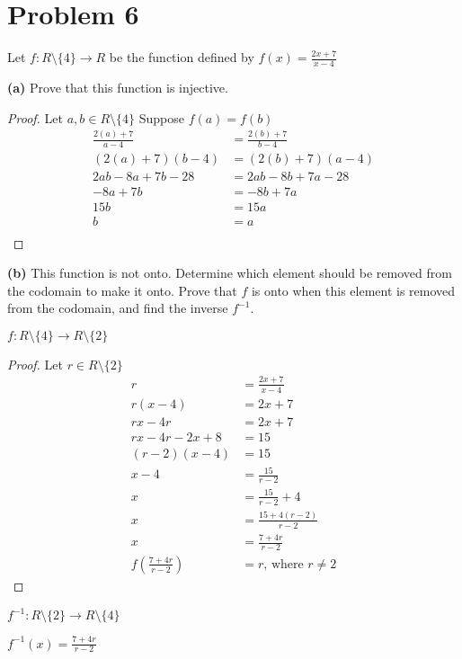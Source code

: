 \documentclass{article}
\newenvironment{problem}[1]{
  \nobreak\section*{Problem #1}
}{}
\begin{document}
  \begin{problem}{6}
    Let $f : R \setminus \{4\} \rightarrow R$ be the function defined by $f(x) = \frac{2x + 7}{x - 4}$
    \begin{flushleft}
      \textbf{(a)} Prove that this function is injective.
    \end{flushleft}
    \begin{proof}
      Let $a, b \in R \setminus \{4\}$ Suppose $f(a) = f(b)$
      \begin{equation*}
        \begin{split}
          \frac{2(a) + 7}{a - 4} & = \frac{2(b) + 7}{b - 4}\\
          (2(a) + 7)(b - 4) & = (2(b) + 7)(a - 4)\\
          2ab - 8a + 7b - 28 & = 2ab - 8b + 7a - 28\\
          -8a + 7b & = -8b + 7a\\
          15b & = 15a\\
          b & = a\\
        \end{split}
      \end{equation*}
    \end{proof}

    \begin{flushleft}
      \textbf{(b)} This function is not onto. Determine which element should be removed from the codomain to make it onto. Prove that $f$ is onto when this element is removed from the codomain, and find the inverse $f^{-1}$.
    \end{flushleft}

    \begin{center}
      $f : R \setminus \{4\} \rightarrow R \setminus \{2\}$
    \end{center}

    \begin{proof}
      Let $r \in R \setminus \{2\}$
      \begin{equation*}
        \begin{split}
          r & = \frac{2x + 7}{x - 4}\\
          r(x - 4) & = 2x + 7\\
          rx - 4r & = 2x + 7\\
          rx - 4r - 2x + 8 & = 15\\
          (r - 2)(x - 4) & = 15\\
          x - 4 & = \frac{15}{r - 2}\\
          x & = \frac{15}{r - 2} + 4\\
          x & = \frac{15 + 4(r - 2)}{r - 2}\\
          x & = \frac{7 + 4r}{r - 2}\\
          f(\frac{7 + 4r}{r - 2}) & = r \text{, where $r \neq 2$}
        \end{split}
      \end{equation*}
    \end{proof}

    \begin{center}
      $f^{-1} : R \setminus \{2\} \rightarrow R \setminus \{4\}$\\
    \end{center}

    \begin{center}
      $f^{-1}(x) = \frac{7 + 4r}{r - 2}$
    \end{center}
  \end{problem}
\end{document}
